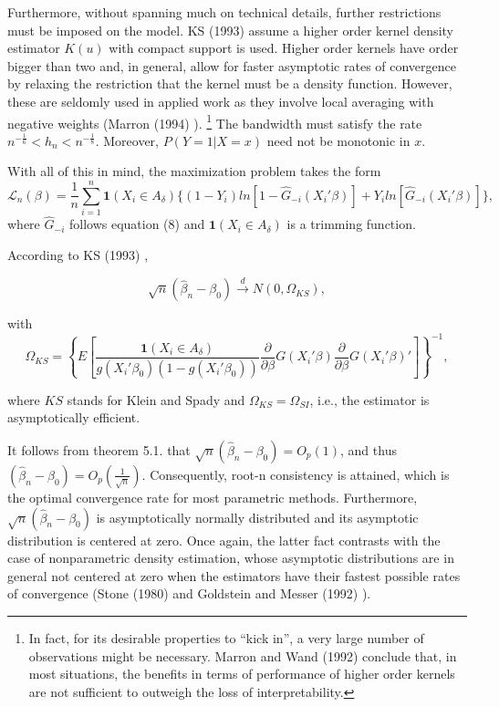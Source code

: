 Furthermore, without spanning much on technical details, further restrictions must be imposed on the model. KS (1993) \cite{[12]} assume a higher order kernel density estimator $K(u)$ with compact support is used. Higher order kernels have order bigger than two and, in general, allow for faster asymptotic rates of convergence by relaxing the restriction that the kernel must be a density function. However, these are seldomly used in applied work as they involve local averaging with negative weights (Marron (1994) \cite{[23]}). \footnote{ In fact, for its desirable properties to ``kick in'', a very large number of observations might be necessary. Marron and Wand (1992) \cite{[24]} conclude that, in most situations, the benefits in terms of performance of higher order kernels are not sufficient to outweigh the loss of interpretability.}
The bandwidth must satisfy the rate $ n^{-\frac{1}{6}} < h_n < n^{-\frac{1}{8}}$. Moreover, $P(Y=1|X=x)$ need not be monotonic in $x$.

With all of this in mind, the maximization problem takes the form
\begin{equation}
\mathcal{L}_n(\beta) = \frac{1}{n}\sum_{i=1}^n \mathbf{1}{(X_i \in A_\delta)} \{ (1 - Y_i)ln[ 1 - \hat{G}_{-i}(X_i'\beta)] +  Y_iln[\hat{G}_{-i}(X_i'\beta)]\},
\end{equation}
where $\hat{G}_{-i}$ follows equation (8) and $\mathbf{1}(X_i \in A_\delta)$ is a trimming function.

\begin{theorem}
According to KS (1993) \cite{[12]}, 

\[\sqrt{n}(\hat{\beta}_{n} - \beta_0) \stackrel{d}{\rightarrow} N(0,\Omega_{KS}),
\]

with  \[ \Omega_{KS} = \left\{ E\left[\frac{\mathbf{1}{(X_i \in A_\delta)}}{g(X_i'\beta_0)(1 - g(X_i'\beta_0))}\frac{\partial}{\partial \beta}
 G(X_i'\beta)\frac{\partial}{\partial \beta} G(X_i'\beta)' \right]\right\}^{-1}, \]
 
where $KS$ stands for Klein and Spady and $\Omega_{KS} = \Omega_{SI}$, i.e., the estimator is asymptotically efficient.

\end{theorem}

It follows from theorem 5.1. that $\sqrt{n}(\hat{\beta}_n - \beta_0)=O_p(1)$, and thus $(\hat{\beta}_n - \beta_0) = O_p\left(\frac{1}{\sqrt{n}}\right)$.  Consequently, root-n consistency is attained, which is the optimal convergence rate for most parametric methods. Furthermore, $\sqrt{n}(\hat{\beta}_n - \beta_0)$ is asymptotically normally distributed and its asymptotic distribution is centered at zero. Once again, the latter fact contrasts with the case of nonparametric density estimation, whose asymptotic distributions are in general not centered at zero when the estimators have their fastest possible rates of convergence (Stone (1980) \cite{[15]} and Goldstein and Messer (1992) \cite{[16]}). 

